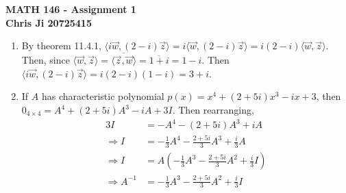 \documentclass[10pt,english]{article}
\begin{document}
\noindent \begin{center}
\textbf{\large{}MATH 146 - Assignment 1}\\
\textbf{\large{}Chris Ji 20725415}
\par\end{center}{\large \par}
\medskip{}

\begin{enumerate}
\pagebreak
\item By theorem 11.4.1, $\langle i\vec{w},(2-i)\vec{z}\rangle=i\langle\vec{w},(2-i)\vec{z}\rangle=i(2-i)\langle\vec{w},\vec{z}\rangle$. Then, since $\langle\vec{w},\vec{z}\rangle=\overline{\langle\vec{z},\vec{w}\rangle}=\overline{1+i}=1-i$. Then $\langle i\vec{w},(2-i)\vec{z}\rangle=i(2-i)(1-i)=3+i$. 

\pagebreak
\item If $A$ has characteristic polynomial $p(x)=x^4+(2+5i)x^3-ix+3$, then $0_{4\times 4}=A^4+(2+5i)A^3-iA+3I$. Then rearranging, 
\begin{align*}
3I&=-A^4-(2+5i)A^3+iA\\
\Rightarrow I &=-\frac{1}{3}A^4-\frac{2+5i}{3}A^3+\frac{i}{3}A \\ 
\Rightarrow I &= A(-\frac{1}{3}A^3-\frac{2+5i}{3}A^2+\frac{i}{3}I) \\ 
\Rightarrow A^{-1} &= -\frac{1}{3}A^3-\frac{2+5i}{3}A^2+\frac{i}{3}I
\end{align*}


\end{enumerate}
\end{document}
